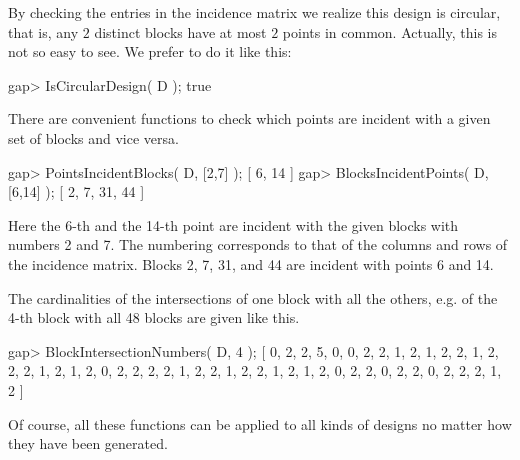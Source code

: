 By checking the entries in the incidence matrix we realize this design is
circular, that is, any $2$ distinct blocks have at most $2$ points in common.
Actually, this is not so easy to see. We prefer to do it like this:
    
\beginexample
    gap> IsCircularDesign( D );
    true
\endexample

There are convenient functions to check which points are incident with
a given set of blocks and vice versa.

\beginexample
    gap> PointsIncidentBlocks( D, [2,7] );
    [ 6, 14 ]
    gap> BlocksIncidentPoints( D, [6,14] );
    [ 2, 7, 31, 44 ]
\endexample

Here the 6-th and the 14-th point are incident with the given blocks with
numbers 2 and 7. The numbering corresponds to that of the columns and rows of
the incidence matrix. Blocks 2, 7, 31, and 44 are incident with points 6 and
14.

The cardinalities of the intersections of one block with all the others,
e.g. of the 4-th block with all 48 blocks are given like this. 

\beginexample
    gap> BlockIntersectionNumbers( D, 4 );
    [ 0, 2, 2, 5, 0, 0, 2, 2, 1, 2, 1, 2, 2, 1, 2, 2, 2, 1, 2, 1, 2, 0, 
      2, 2, 2, 2, 1, 2, 2, 1, 2, 2, 1, 2, 1, 2, 0, 2, 2, 0, 2, 2, 0, 2, 
      2, 2, 1, 2 ]
\endexample

Of course, all these functions can be applied to all kinds of designs no
matter how they have been generated.




